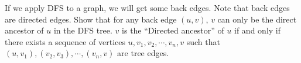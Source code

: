 If we apply DFS to a graph, we will get some back edges. Note that back
edges are directed edges. Show that for any back edge $(u,v)$, $v$ can
only be the direct ancestor of $u$ in the DFS tree. $v$ is the ``Directed 
ancestor'' of $u$ if and only if there exists a sequence of vertices 
$u,v_1,v_2,\cdots,v_n,v$
such that $(u,v_1),(v_2,v_3),\cdots,(v_n,v)$  are tree edges.

